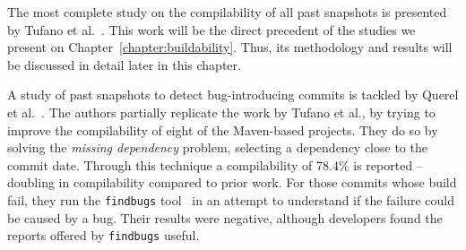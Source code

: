 The most complete study on the compilability of all past snapshots is presented by Tufano et al.~\cite{tufano2017there}.
This work will be the direct precedent of the studies we present on Chapter~\ref{chapter:buildability}. 
Thus, its methodology and results will be discussed in detail later in this chapter.

A study of past snapshots to detect bug-introducing commits is tackled by Querel et al.~\cite{querel:2021:warning}. 
The authors partially replicate the work by Tufano et al., by trying to improve the compilability of eight of the Maven-based projects. 
They do so by solving the \textit{missing dependency} problem, selecting a dependency close to the commit date. 
Through this technique a compilability of 78.4\% is reported -- doubling in compilability compared to prior work. For those commits whose build fail, they run the \texttt{findbugs} tool~\cite{ayewah2007using} in an attempt to understand if the failure could be caused by a bug. 
Their results were negative, although developers found the reports offered by \texttt{findbugs} useful.
